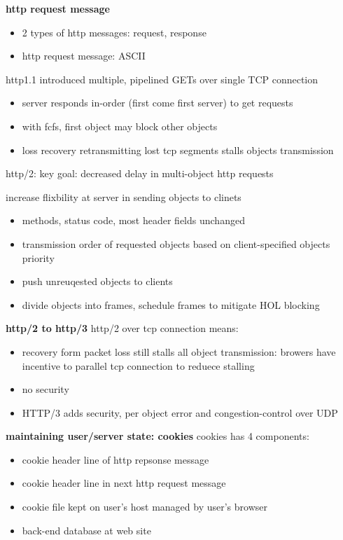 \documentclass[10pt]{article}
\theoremstyle{break}
\begin{document}
\textbf{http request message}
\begin{itemize}
    \item 2 types of http messages: request, response 
    \item http request message: ASCII
\end{itemize}

http1.1 introduced multiple, pipelined GETs over single TCP connection 
\begin{itemize}
    \item server responds in-order (first come first server) to get requests 
    \item with fcfs, first object may block other objects 
    \item loss recovery retransmitting lost tcp segments stalls objects transmission
\end{itemize}

http/2: key goal: decreased delay in multi-object http requests 

increase flixbility at server in sending objects to clinets 
\begin{itemize}
    \item methods, status code, most header fields unchanged 
    \item transmission order of requested objects based on client-specified objects priority
    \item push unreuqested objects to clients
    \item divide objects into frames, schedule frames to mitigate HOL blocking
\end{itemize}

\textbf{http/2 to http/3}
http/2 over tcp connection means:
\begin{itemize}
    \item recovery form packet loss still stalls all object transmission: browers have incentive to parallel tcp connection to reduece stalling 
    \item no security 
    \item HTTP/3 adds security, per object error and congestion-control over UDP
\end{itemize}

\textbf{maintaining user/server state: cookies}
cookies has 4 components: 
\begin{itemize}
    \item cookie header line of http repsonse message 
    \item cookie header line in next http request message 
    \item cookie file kept on user's host managed by user's browser 
    \item back-end database at web site
\end{itemize}
\end{document}
